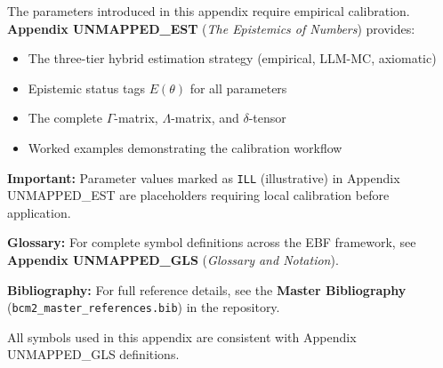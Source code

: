 \begin{tcolorbox}[colback=blue!5!white, colframe=blue!75!black, 
    title=\textbf{Parameter Calibration: See Appendix UNMAPPED_EST}]
    
The parameters introduced in this appendix require empirical calibration. 
\textbf{Appendix UNMAPPED_EST} (\textit{The Epistemics of Numbers}) provides:

\begin{itemize}[nosep]
    \item The three-tier hybrid estimation strategy (empirical, LLM-MC, axiomatic)
    \item Epistemic status tags $E(\theta)$ for all parameters
    \item The complete $\Gamma$-matrix, $\Lambda$-matrix, and $\delta$-tensor
    \item Worked examples demonstrating the calibration workflow
\end{itemize}

\textbf{Important:} Parameter values marked as \texttt{ILL} (illustrative) in 
Appendix UNMAPPED_EST are placeholders requiring local calibration before application.

\end{tcolorbox}





\begin{tcolorbox}[colback=blue!5!white, colframe=blue!75!black, 
    title=\textbf{Central References}]

\textbf{Glossary:} For complete symbol definitions across the EBF framework, 
see \textbf{Appendix UNMAPPED_GLS} (\textit{Glossary and Notation}).

\textbf{Bibliography:} For full reference details, see the 
\textbf{Master Bibliography} (\texttt{bcm2\_master\_references.bib}) 
in the repository.

All symbols used in this appendix are consistent with Appendix UNMAPPED_GLS definitions.

\end{tcolorbox}

